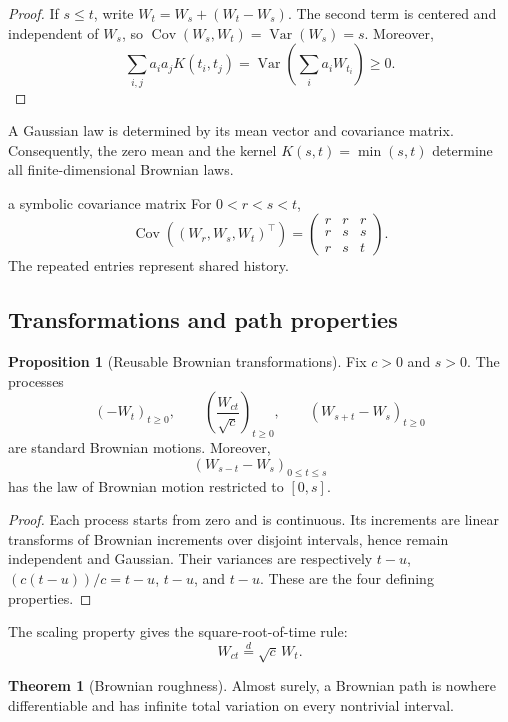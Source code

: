 \documentclass[10pt]{article}
\newcommand{\Var}{\operatorname{Var}}
\newcommand{\Cov}{\operatorname{Cov}}
\newcommand{\1}{\mathbf 1}
\theoremstyle{definition}
\newtheorem{proposition}[definition]{Proposition}
\newtheorem{theorem}[definition]{Theorem}
\begin{document}
\begin{proof}
If \(s\leq t\), write \(W_t=W_s+(W_t-W_s)\). The second term is centered
and independent of \(W_s\), so
\(\Cov(W_s,W_t)=\Var(W_s)=s\). Moreover,
\[
\sum_{i,j}a_ia_jK(t_i,t_j)
=\Var\!\left(\sum_i a_iW_{t_i}\right)\geq0.
\]
\end{proof}

A Gaussian law is determined by its mean vector and covariance matrix.
Consequently, the zero mean and the kernel \(K(s,t)=\min(s,t)\) determine all
finite-dimensional Brownian laws.

\begin{boardexample}{a symbolic covariance matrix}
For \(0<r<s<t\),
\[
\Cov\!\left((W_r,W_s,W_t)^\top\right)
=\begin{pmatrix}
r&r&r\\ r&s&s\\ r&s&t
\end{pmatrix}.
\]
The repeated entries represent shared history.
\end{boardexample}

\subsection{Transformations and path properties}

\begin{proposition}[Reusable Brownian transformations]
Fix \(c>0\) and \(s>0\). The processes
\[
(-W_t)_{t\geq0},
\qquad
\left(\frac{W_{ct}}{\sqrt c}\right)_{t\geq0},
\qquad
(W_{s+t}-W_s)_{t\geq0}
\]
are standard Brownian motions. Moreover,
\[
(W_{s-t}-W_s)_{0\leq t\leq s}
\]
has the law of Brownian motion restricted to \([0,s]\).
\end{proposition}

\begin{proof}
Each process starts from zero and is continuous. Its increments are linear
transforms of Brownian increments over disjoint intervals, hence remain
independent and Gaussian. Their variances are respectively \(t-u\),
\((c(t-u))/c=t-u\), \(t-u\), and \(t-u\). These are the four defining
properties.
\end{proof}

The scaling property gives the square-root-of-time rule:
\[
W_{ct}\overset d=\sqrt c\,W_t.
\]

\begin{theorem}[Brownian roughness]
Almost surely, a Brownian path is nowhere differentiable and has infinite
total variation on every nontrivial interval.
\end{theorem}
\end{document}
